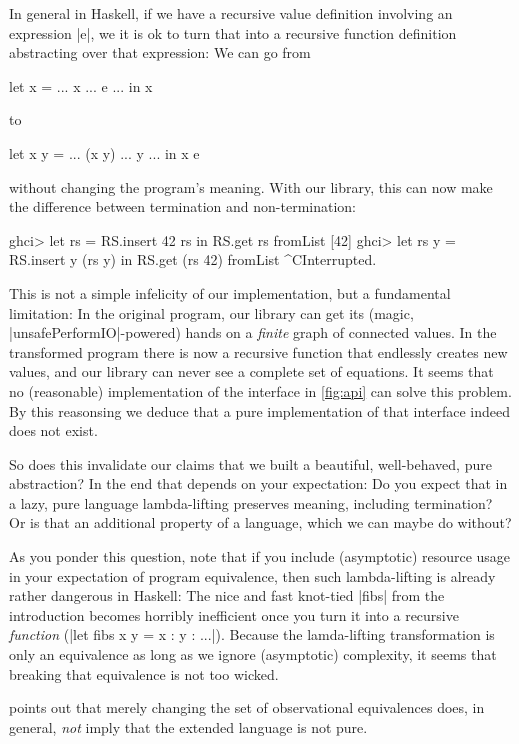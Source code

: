 \documentclass[manuscript,anonymous,screen,acmsmall]{acmart}
\begin{document}
In general in Haskell, if we have a recursive value definition involving an expression |e|, we it is ok to turn that into a recursive function definition abstracting over that expression: We can go from
\begin{code}
let x = ... x ... e ... in x
\end{code}
to
\begin{code}
let x y = ... (x y) ... y ... in x e
\end{code}
without changing the program's meaning. With our library, this can now make the difference between termination and non-termination:
\begin{code}
ghci> let rs = RS.insert 42 rs in RS.get rs
fromList [42]
ghci> let rs y = RS.insert y (rs y) in RS.get (rs 42)
fromList ^CInterrupted.
\end{code}

This is not a simple infelicity of our implementation, but a fundamental limitation: In the original program, our library can get its (magic, |unsafePerformIO|-powered) hands on a \emph{finite} graph of connected values. In the transformed program there is now a recursive function that endlessly creates new values, and our library can never see a complete set of equations. It seems that no (reasonable) implementation of the interface in \cref{fig:api} can solve this problem. By this reasonsing we deduce that a pure implementation of that interface indeed does not exist.

So does this invalidate our claims that we built a beautiful, well-behaved, pure abstraction? In the end that depends on your expectation: Do you expect that in a lazy, pure language lambda-lifting preserves meaning, including termination? Or is that an additional property of a language, which we can maybe do without?

As you ponder this question, note that if you include (asymptotic) resource usage in your expectation of program equivalence, then such lambda-lifting is already rather dangerous in Haskell: The nice and fast knot-tied |fibs| from the introduction becomes horribly inefficient once you turn it into a recursive \emph{function} (|let fibs x y = x : y  : ...|). Because the lamda-lifting transformation is only an equivalence as long as we ignore (asymptotic) complexity, it seems that breaking that equivalence is not too wicked.

 points out that merely changing the set of observational equivalences does, in general, \emph{not} imply that the extended language is not pure.
\end{document}
